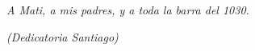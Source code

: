 \chapter*{}
\begin{flushright}
  \textit{A Mati, a mis padres, y a toda la barra del 1030.}

  \textit{(Dedicatoria Santiago)}
\end{flushright}
\newpage
